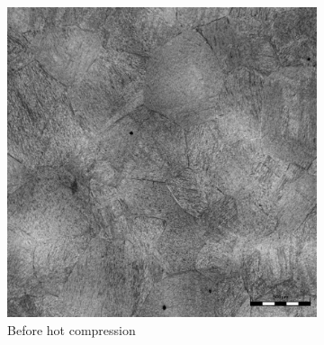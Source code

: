 \documentclass[metals,article,accept,pdftex,moreauthors]{Definitions/mdpi}
\begin{document}
\begin{figure}[H]

\begin{subfigure}[b]{0.44\columnwidth}

\includegraphics[width=\columnwidth]{Figures/BeforeCompM}
\caption{\centering Before hot compression}
\end{subfigure}
\hspace{10mm}
\begin{subfigure}[b]{0.44\columnwidth}


\end{subfigure}
\end{figure}
\end{document}
